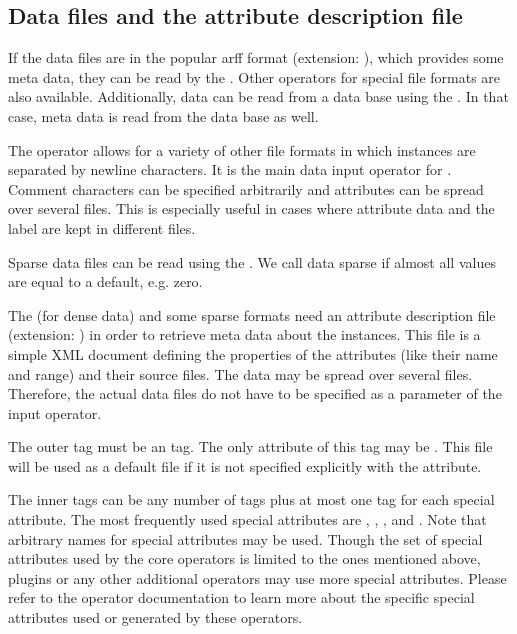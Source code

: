 {\subsection{Data files and the attribute description file}
\label{attribute_description_file}

If the data files are in the popular arff format (extension:
), which provides some meta data,
they can be read by the . Other operators for
special file formats are also available. Additionally, data can be read from a
data base using the . In that case, meta data is
read from the data base as well.

The  operator allows for a variety of other file formats in
which instances are separated by newline characters. It is the main data input
operator for \rapidminer. Comment characters can be 
specified arbitrarily and attributes can be spread
over several files. This is especially useful in cases where attribute data and
the label are kept in different files.

Sparse data files can be read using the
. We call data sparse if almost all values are
equal to a default, e.g. zero.

The  (for dense data) and some sparse formats
need an attribute description file (extension: ) in order to
retrieve meta data about the instances. This file is a simple XML document
defining the properties of the attributes (like their name and range) and
their source files. The data may be spread over several files. Therefore, the
actual data files do not have to be specified as a parameter of
the input operator.

The outer tag must be an  tag. 
The only attribute of this tag may be .
This file will be used as a default file if it is not specified
explicitly with the attribute.

The inner tags can be any number of  tags plus at
most one tag for each special attribute. The most frequently used
special attributes are , , , and . 
Note that arbitrary names for special attributes may be
used. Though the set of special attributes used by the core \rapidminer
operators is limited to the ones mentioned above, plugins or
any other additional operators may use more special attributes. Please
refer to the operator documentation to learn more about the specific
special attributes used or generated by these operators.

}

